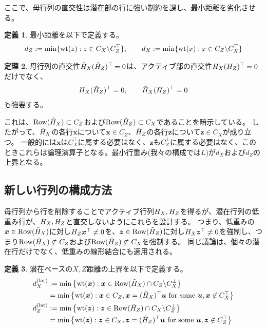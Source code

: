 \documentclass[a4paper,11pt,dvipdfmx]{jsarticle}
\theoremstyle{definition}
\newtheorem{definition}{定義}[section]
\newtheorem{theorem}[definition]{定理}
\begin{document}
ここで、母行列の直交性は潜在部の行に強い制約を課し、最小距離を劣化させる。
\begin{definition}\label{def:01233}
最小距離を以下で定義する。
\begin{align}\label{eq:01234}
  d_Z := \min\{\text{wt}(z):z\in C_X\backslash C_Z^\top\},\qquad
  d_X := \min\{\text{wt}(x):x\in C_Z\backslash C_X^\top\}
\end{align}  
\end{definition}
\begin{theorem}\label{th:01235}
  母行列の直交性$\hat{H}_X(\hat{H}_Z)^\top=0$は、アクティブ部の直交性$H_X(H_Z)^\top=0$だけでなく、
  \begin{align}\label{eq:01236}
    H_X(\tilde{H}_Z)^\top=0,\qquad
    \tilde{H}_X(H_Z)^\top=0
  \end{align}
  も強要する。  
\end{theorem}
これは、$\text{Row}(\hat{H}_X)\subset C_Z$および$\text{Row}(\hat{H}_Z)\subset C_X$であることを暗示している。
したがって、$\tilde{H}_X$の各行$\bm{x}$について$\bm{x}\in C_Z$、$\tilde{H}_Z$の各行$\bm{z}$について$\bm{z}\in C_X$が成り立つ。
一般的には$\bm{x}$は$C_X^\top$に属する必要はなく、$\bm{z}$も$C_Z^\perp$に属する必要はなく、このときこれらは論理演算子となる。最小行重み(我々の構成では$L$)が$d_X$および$d_Z$の上界となる。

\subsection{新しい行列の構成方法}
母行列から行を削除することでアクティブ行列$H_X,H_Z$を得るが、潜在行列の低重み行が、$H_X,H_Z$と直交しないようにこれらを設計する。
つまり、低重みの$\bm{x}\in\text{Row}(\tilde{H}_X)$に対し$H_Z\bm{x}^\top \neq 0$を、$\bm{z}\in\text{Row}(\tilde{H}_Z)$に対し$H_X\bm{z}^\top \neq 0$を強制し、つまり$\text{Row}(\tilde{H}_X)\not\subset C_Z$および$\text{Row}(\tilde{H}_Z)\not\subset C_X$を強制する。
同じ議論は、個々の潜在行だけでなく、低重みの線形結合にも適用される。

\begin{definition}\label{def:01237}
  潜在ベースの$X,Z$距離の上界を以下で定義する。
  \begin{align}
  d_X^{\text{(lat)}} &:= \min\left\{\text{wt}(\bm{x}):\bm{x}\in \text{Row}(\tilde{H}_X)\cap C_Z\backslash C_X^\perp\right\}\\
  &=\min\left\{\text{wt}(\bm{x}):\bm{x}\in C_Z, \bm{x}=(\tilde{H}_X)^\top\bm{u}\text{ for some }\bm{u}, \bm{x}\not\in C_X^\top\right\}\\
  d_Z^{\text{(lat)}} &:= \min\left\{\text{wt}(\bm{z}):\bm{z}\in \text{Row}(\tilde{H}_Z)\cap C_X\backslash C_Z^\perp\right\} \\
  &=\min\left\{\text{wt}(\bm{z}):\bm{z}\in C_X, \bm{z}=(\tilde{H}_Z)^\top\bm{u}\text{ for some }\bm{u}, \bm{z}\not\in C_Z^\top\right\}\\
\end{align}
\end{definition}
\end{document}
